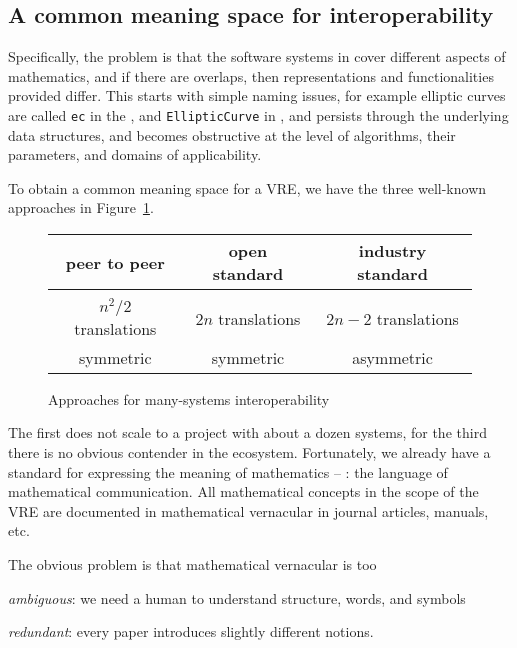 \subsection{A common meaning space for interoperability}

Specifically, the problem is that the software systems in \ODK cover different aspects of
mathematics, and if there are overlaps, then representations and functionalities provided 
differ.
This starts with simple naming issues, for example elliptic curves are called
\lstinline|ec| in the \LMFDB, and \lstinline|EllipticCurve| in \Sage, and persists through
the underlying data structures, and becomes obstructive at the level of algorithms, their
parameters, and domains of applicability.

To obtain a common meaning space for a VRE, we have the three well-known approaches in
Figure~\ref{fig:interop}.
\begin{figure}[ht]\centering
  \begin{tabular}{|c|c|c|}\hline
    peer to peer & open standard & industry standard\\\hline
     &  & \\\hline
    $n^2/2$  translations & $2n$ translations & $2n-2$ translations \\
    symmetric & symmetric & asymmetric\\\hline
  \end{tabular}
  \caption{Approaches for many-systems interoperability}\label{fig:interop}
\end{figure}

The first does not scale to a project with about a dozen systems, for the third there is
no obvious contender in the \ODK ecosystem. Fortunately, we already have a standard for
expressing the meaning of mathematics -- : the language of
mathematical communication. All mathematical concepts in the scope of the \ODK VRE are documented
in mathematical vernacular in journal articles, manuals, etc.

The obvious problem is that mathematical vernacular is too 
\begin{inparaenum}[\em i\rm)]
\item \emph{ambiguous}: we need a human to understand structure, words, and symbols
\item \emph{redundant}: every paper introduces slightly different notions. 
\end{inparaenum}

